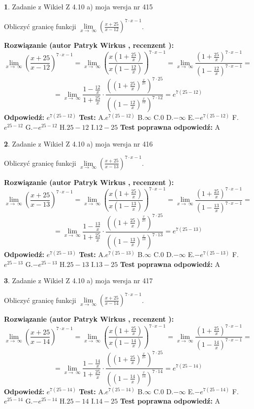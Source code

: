 \documentclass[12pt, a4paper]{article}
\theoremstyle{definition} %
\newtheorem{zad}{}
\newcommand{\zadStart}[1]{\begin{zad}#1\newline}
\newcommand{\zadStop}{\end{zad}}
\newcommand{\rozwStart}[2]{\noindent \textbf{Rozwiązanie (autor #1 , recenzent #2): }\newline}
\newcommand{\rozwStop}{\newline}
\newcommand{\odpStart}{\noindent \textbf{Odpowiedź:}\newline}
\newcommand{\odpStop}{\newline}
\newcommand{\testStart}{\noindent \textbf{Test:}\newline}
\newcommand{\testStop}{\newline}
\newcommand{\kluczStart}{\noindent \textbf{Test poprawna odpowiedź:}\newline}
\newcommand{\kluczStop}{\newline}
\begin{document}
\zadStart{Zadanie z Wikieł Z 4.10 a) moja wersja nr 415}


Obliczyć granicę funkcji  $\lim\limits_{x\to\ \infty}(\frac{x+25}{x-12})^{7\cdot x-1}$.
\zadStop
\rozwStart{Patryk Wirkus}{}
$$\lim\limits_{x\to\ \infty}(\frac{x+25}{x-12})^{7\cdot x-1} = \lim\limits_{x\to\ \infty}(\frac{x(1+\frac{25}{x})}{x(1-\frac{12}{x})})^{7\cdot x-1}=\lim\limits_{x\to\ \infty}\frac{(1+\frac{25}{x})^{7\cdot x-1}}{(1-\frac{12}{x})^{7\cdot x-1}}=$$
$$=\lim\limits_{x\to\ \infty}\frac{1-\frac{12}{x}}{1+\frac{25}{x}}\cdot\frac{((1+\frac{25}{x})^{\frac{x}{25}})^{7\cdot25}}{((1-\frac{12}{x})^{\frac{x}{12}})^{7\cdot12}}=e^{7(25-12)}$$
\rozwStop
\odpStart
$e^{7(25-12)}$
\odpStop
\testStart
A.$e^{7(25-12)}$ B.$\infty$ C.$0$ D.$-\infty$ E.$-e^{7(25-12)}$
F.$e^{25-12}$ G.$-e^{25-12}$
H.$25-12$
I.$12-25$
\testStop
\kluczStart
A
\kluczStop



\zadStart{Zadanie z Wikieł Z 4.10 a) moja wersja nr 416}


Obliczyć granicę funkcji  $\lim\limits_{x\to\ \infty}(\frac{x+25}{x-13})^{7\cdot x-1}$.
\zadStop
\rozwStart{Patryk Wirkus}{}
$$\lim\limits_{x\to\ \infty}(\frac{x+25}{x-13})^{7\cdot x-1} = \lim\limits_{x\to\ \infty}(\frac{x(1+\frac{25}{x})}{x(1-\frac{13}{x})})^{7\cdot x-1}=\lim\limits_{x\to\ \infty}\frac{(1+\frac{25}{x})^{7\cdot x-1}}{(1-\frac{13}{x})^{7\cdot x-1}}=$$
$$=\lim\limits_{x\to\ \infty}\frac{1-\frac{13}{x}}{1+\frac{25}{x}}\cdot\frac{((1+\frac{25}{x})^{\frac{x}{25}})^{7\cdot25}}{((1-\frac{13}{x})^{\frac{x}{13}})^{7\cdot13}}=e^{7(25-13)}$$
\rozwStop
\odpStart
$e^{7(25-13)}$
\odpStop
\testStart
A.$e^{7(25-13)}$ B.$\infty$ C.$0$ D.$-\infty$ E.$-e^{7(25-13)}$
F.$e^{25-13}$ G.$-e^{25-13}$
H.$25-13$
I.$13-25$
\testStop
\kluczStart
A
\kluczStop



\zadStart{Zadanie z Wikieł Z 4.10 a) moja wersja nr 417}


Obliczyć granicę funkcji  $\lim\limits_{x\to\ \infty}(\frac{x+25}{x-14})^{7\cdot x-1}$.
\zadStop
\rozwStart{Patryk Wirkus}{}
$$\lim\limits_{x\to\ \infty}(\frac{x+25}{x-14})^{7\cdot x-1} = \lim\limits_{x\to\ \infty}(\frac{x(1+\frac{25}{x})}{x(1-\frac{14}{x})})^{7\cdot x-1}=\lim\limits_{x\to\ \infty}\frac{(1+\frac{25}{x})^{7\cdot x-1}}{(1-\frac{14}{x})^{7\cdot x-1}}=$$
$$=\lim\limits_{x\to\ \infty}\frac{1-\frac{14}{x}}{1+\frac{25}{x}}\cdot\frac{((1+\frac{25}{x})^{\frac{x}{25}})^{7\cdot25}}{((1-\frac{14}{x})^{\frac{x}{14}})^{7\cdot14}}=e^{7(25-14)}$$
\rozwStop
\odpStart
$e^{7(25-14)}$
\odpStop
\testStart
A.$e^{7(25-14)}$ B.$\infty$ C.$0$ D.$-\infty$ E.$-e^{7(25-14)}$
F.$e^{25-14}$ G.$-e^{25-14}$
H.$25-14$
I.$14-25$
\testStop
\kluczStart
A
\kluczStop
\end{document}
